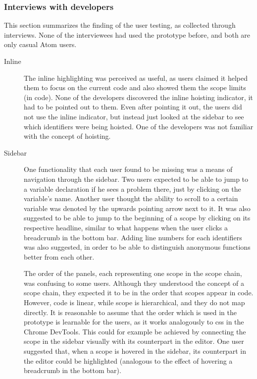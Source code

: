 \subsubsection{Interviews with
developers}\label{interviews-with-developers}

This section summarizes the finding of the user testing, as collected
through interviews. None of the interviewees had used the prototype
before, and both are only casual Atom users.

\begin{description}
\item[Inline]
The inline highlighting was perceived as useful, as users claimed it
helped them to focus on the current code and also showed them the scope
limits (in code). None of the developers discovered the inline hoisting
indicator, it had to be pointed out to them. Even after pointing it out,
the users did not use the inline indicator, but instead just looked at
the sidebar to see which identifiers were being hoisted. One of the
developers was not familiar with the concept of hoisting.
\item[Sidebar]
One functionality that each user found to be missing was a means of
navigation through the sidebar. Two users expected to be able to jump to
a variable declaration if he sees a problem there, just by clicking on
the variable’s name. Another user thought the ability to scroll to a
certain variable was denoted by the upwards pointing arrow next to it.
It was also suggested to be able to jump to the beginning of a scope by
clicking on its respective headline, similar to what happens when the
user clicks a breadcrumb in the bottom bar. Adding line numbers for each
identifiers was also suggested, in order to be able to distinguish
anonymous functions better from each other.

The order of the panels, each representing one scope in the scope chain,
was confusing to some users. Although they understood the concept of a
scope chain, they expected it to be in the order that scopes appear in
code. However, code is linear, while scope is hierarchical, and they do
not map directly. It is reasonable to assume that the order which is
used in the prototype is learnable for the users, as it works
analogously to \ac{css} in the Chrome DevTools. This could for example
be achieved by connecting the scope in the sidebar visually with its
counterpart in the editor. One user suggested that, when a scope is
hovered in the sidebar, its counterpart in the editor could be
highlighted (analogous to the effect of hovering a breadcrumb in the
bottom bar).


\end{description}

